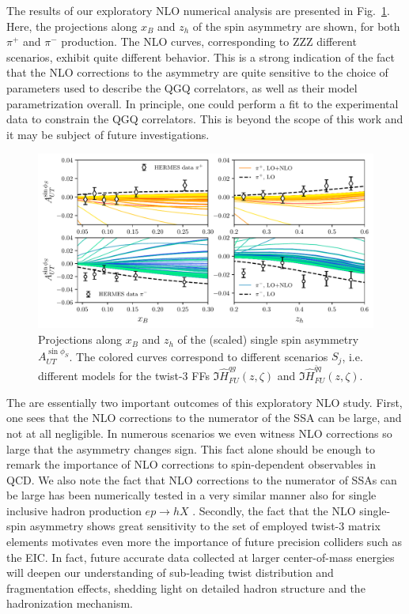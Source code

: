 The results of our exploratory NLO numerical analysis are presented in Fig.~\ref{fig:A_UT_NLO}. Here, the projections along $x_B$ and $z_h$ of the spin asymmetry are shown, for both $\pi^+$ and $\pi^-$ production. The NLO curves, corresponding to ZZZ different scenarios, exhibit quite different behavior. This is a strong indication of the fact that the NLO corrections to the asymmetry are quite sensitive to the choice of parameters used to describe the QGQ correlators, as well as their model parametrization overall. In principle, one could perform a fit to the experimental data to constrain the QGQ correlators. This is beyond the scope of this work and it may be subject of future investigations.

\begin{figure}[h]
    \centering
    \includegraphics[width=0.99\linewidth]{fig/A_UT_NLO.pdf}
    \caption{Projections along $x_B$ and $z_h$ of the (scaled) single spin asymmetry $A_{UT}^{\sin\phi_S}$. The colored curves correspond to different scenarios $S_j$, i.e. different models for the twist-3 FFs  $\Im \hat{H}^{qg}_{FU}(z,\zeta) $ and $\Im \hat{H}^{\bar{q}q}_{FU}(z,\zeta) $.}
    \label{fig:A_UT_NLO}
\end{figure}

The are essentially two important outcomes of this exploratory NLO study. First, one sees that the NLO corrections to the numerator of the SSA can be large, and not at all negligible. In numerous scenarios we even witness NLO corrections so large that the asymmetry changes sign. This fact alone should be enough to remark the importance of NLO corrections to spin-dependent observables in QCD. We also note the fact that NLO corrections to the numerator of SSAs can be large has been numerically tested in a very similar manner also for single inclusive hadron production $ep\to hX$ \cite{rein2025}. Secondly, the fact that the NLO single-spin asymmetry shows great sensitivity to the set of employed twist-3 matrix elements motivates even more the importance of future precision colliders such as the EIC. In fact, future accurate data collected at larger center-of-mass energies will deepen our understanding of sub-leading twist distribution and fragmentation effects, shedding light on detailed hadron structure and the hadronization mechanism. 














\clearpage